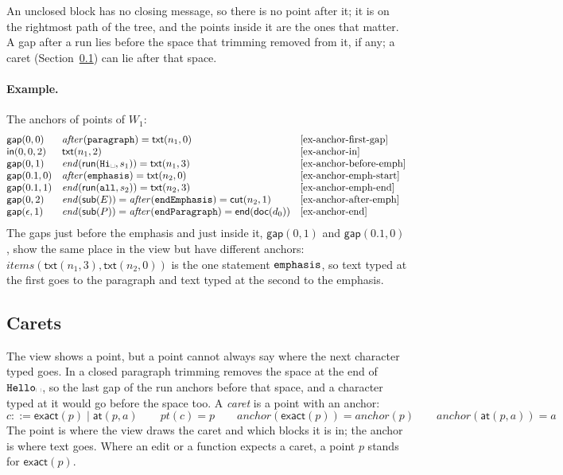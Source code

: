 \documentclass[11pt]{article}
\numberwithin{equation}{section}
\newcommand{\kw}[1]{\ensuremath{\mathsf{#1}}}
\newcommand{\str}[1]{\ensuremath{\text{\texttt{#1}}}}
\newcommand{\vs}{\text{\textvisiblespace}}
\begin{document}
An unclosed block has no closing message, so there is no point after it;
it is on the rightmost path of the tree, and the points inside it are the
ones that matter.  A gap after a run lies before the space that trimming
removed from it, if any; a caret (Section~\ref{sec:carets}) can lie after
that space.

\paragraph{Example.}  The anchors of points of $W_1$:
\[
\begin{array}{@{}lll@{}}
\kw{gap}(0, 0) & \mathit{after}(\str{paragraph}) = \kw{txt}(n_1, 0)
  & \text{[ex-anchor-first-gap]} \\
\kw{in}(0, 0, 2) & \kw{txt}(n_1, 2) & \text{[ex-anchor-in]} \\
\kw{gap}(0, 1) & \mathit{end}(\kw{run}(\str{Hi}\vs, s_1)) =
  \kw{txt}(n_1, 3) & \text{[ex-anchor-before-emph]} \\
\kw{gap}(0.1, 0) & \mathit{after}(\str{emphasis}) = \kw{txt}(n_2, 0)
  & \text{[ex-anchor-emph-start]} \\
\kw{gap}(0.1, 1) & \mathit{end}(\kw{run}(\str{all}, s_2)) =
  \kw{txt}(n_2, 3) & \text{[ex-anchor-emph-end]} \\
\kw{gap}(0, 2) & \mathit{end}(\kw{sub}(E)) =
  \mathit{after}(\str{endEmphasis}) = \kw{cut}(n_2, 1)
  & \text{[ex-anchor-after-emph]} \\
\kw{gap}(\epsilon, 1) & \mathit{end}(\kw{sub}(P)) =
  \mathit{after}(\str{endParagraph}) = \kw{end}(\kw{doc}(d_0))
  & \text{[ex-anchor-end]}
\end{array}
\]
The gaps just before the emphasis and just inside it, $\kw{gap}(0, 1)$ and
$\kw{gap}(0.1, 0)$, show the same place in the view but have different
anchors: $\mathit{items}(\kw{txt}(n_1, 3), \kw{txt}(n_2, 0))$ is the one
statement $\str{emphasis}$, so text typed at the first goes to the
paragraph and text typed at the second to the emphasis.

\subsection{Carets}
\label{sec:carets}

The view shows a point, but a point cannot always say where the next
character typed goes.  In a closed paragraph trimming removes the space at
the end of $\str{Hello}\vs$, so the last gap of the run anchors before that
space, and a character typed at it would go before the space too.  A
\emph{caret} is a point with an anchor:
\begin{equation}\label{eq:carets}
c ::= \kw{exact}(p) \mid \kw{at}(p, a)
\qquad
\mathit{pt}(c) = p
\qquad
\mathit{anchor}(\kw{exact}(p)) = \mathit{anchor}(p)
\qquad
\mathit{anchor}(\kw{at}(p, a)) = a
\end{equation}
The point is where the view draws the caret and which blocks it is in; the
anchor is where text goes.  Where an edit or a function expects a caret, a
point $p$ stands for $\kw{exact}(p)$.
\end{document}
